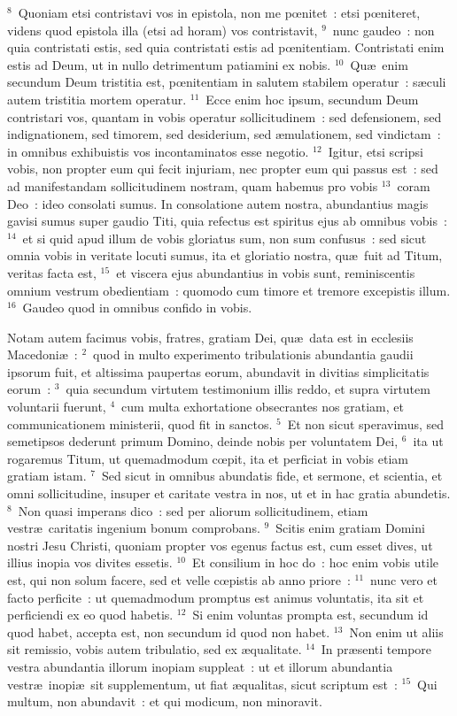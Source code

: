 ${}^{8}$~Quoniam etsi contristavi vos in epistola, non me pœnitet~: etsi pœniteret, videns quod epistola illa (etsi ad horam) vos contristavit,
${}^{9}$~nunc gaudeo~: non quia contristati estis, sed quia contristati estis ad pœnitentiam. Contristati enim estis ad Deum, ut in nullo detrimentum patiamini ex nobis.
${}^{10}$~Qu\ae\ enim secundum Deum tristitia est, pœnitentiam in salutem stabilem operatur~: s\ae culi autem tristitia mortem operatur.
${}^{11}$~Ecce enim hoc ipsum, secundum Deum contristari vos, quantam in vobis operatur sollicitudinem~: sed defensionem, sed indignationem, sed timorem, sed desiderium, sed \ae mulationem, sed vindictam~: in omnibus exhibuistis vos incontaminatos esse negotio.
${}^{12}$~Igitur, etsi scripsi vobis, non propter eum qui fecit injuriam, nec propter eum qui passus est~: sed ad manifestandam sollicitudinem nostram, quam habemus pro vobis
${}^{13}$~coram Deo~: ideo consolati sumus. In consolatione autem nostra, abundantius magis gavisi sumus super gaudio Titi, quia refectus est spiritus ejus ab omnibus vobis~:
${}^{14}$~et si quid apud illum de vobis gloriatus sum, non sum confusus~: sed sicut omnia vobis in veritate locuti sumus, ita et gloriatio nostra, qu\ae\ fuit ad Titum, veritas facta est,
${}^{15}$~et viscera ejus abundantius in vobis sunt, reminiscentis omnium vestrum obedientiam~: quomodo cum timore et tremore excepistis illum.
${}^{16}$~Gaudeo quod in omnibus confido in vobis.

\lettrine[lines=3,image=true,loversize=0.05,lraise=-0.03]{N}{}otam autem facimus vobis, fratres, gratiam Dei, qu\ae\ data est in ecclesiis Macedoni\ae~:
${}^{2}$~quod in multo experimento tribulationis abundantia gaudii ipsorum fuit, et altissima paupertas eorum, abundavit in divitias simplicitatis eorum~:
${}^{3}$~quia secundum virtutem testimonium illis reddo, et supra virtutem voluntarii fuerunt,
${}^{4}$~cum multa exhortatione obsecrantes nos gratiam, et communicationem ministerii, quod fit in sanctos.
${}^{5}$~Et non sicut speravimus, sed semetipsos dederunt primum Domino, deinde nobis per voluntatem Dei,
${}^{6}$~ita ut rogaremus Titum, ut quemadmodum cœpit, ita et perficiat in vobis etiam gratiam istam.
${}^{7}$~Sed sicut in omnibus abundatis fide, et sermone, et scientia, et omni sollicitudine, insuper et caritate vestra in nos, ut et in hac gratia abundetis.
${}^{8}$~Non quasi imperans dico~: sed per aliorum sollicitudinem, etiam vestr\ae\ caritatis ingenium bonum comprobans.
${}^{9}$~Scitis enim gratiam Domini nostri Jesu Christi, quoniam propter vos egenus factus est, cum esset dives, ut illius inopia vos divites essetis.
${}^{10}$~Et consilium in hoc do~: hoc enim vobis utile est, qui non solum facere, sed et velle cœpistis ab anno priore~:
${}^{11}$~nunc vero et facto perficite~: ut quemadmodum promptus est animus voluntatis, ita sit et perficiendi ex eo quod habetis.
${}^{12}$~Si enim voluntas prompta est, secundum id quod habet, accepta est, non secundum id quod non habet.
${}^{13}$~Non enim ut aliis sit remissio, vobis autem tribulatio, sed ex \ae qualitate.
${}^{14}$~In pr\ae senti tempore vestra abundantia illorum inopiam suppleat~: ut et illorum abundantia vestr\ae\ inopi\ae\ sit supplementum, ut fiat \ae qualitas, sicut scriptum est~:
${}^{15}$~Qui multum, non abundavit~: et qui modicum, non minoravit.


